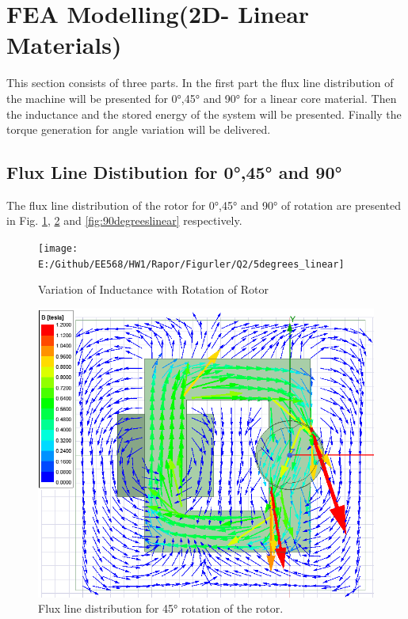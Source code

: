 \documentclass{article}
\begin{document}
\section{FEA Modelling(2D- Linear Materials)}
This section consists of three parts. In the first part the flux line distribution of the machine will be presented for \ang{0},\ang{45} and \ang{90} for a linear core material. Then the inductance and the stored energy of the system will be presented. Finally the torque generation for angle variation will be delivered.

\subsection{Flux Line Distibution for \ang{0},\ang{45} and \ang{90}}
The flux line distribution of the rotor for \ang{0},\ang{45} and \ang{90} of rotation are presented in Fig. \ref{fig:5degreeslinear}, \ref{fig:45degreeslinear} and \ref{fig:90degreeslinear} respectively.
\begin{figure}[H]
	\centering
	\texttt{[image: E:/Github/EE568/HW1/Rapor/Figurler/Q2/5degrees\_linear]}
	\caption{Variation of Inductance with Rotation of Rotor}
	\label{fig:5degreeslinear}
\end{figure}

\begin{figure}[H]
	\centering
	\includegraphics[width=1\linewidth]{Figurler/Q2/45degrees_linear}
	\caption{Flux line distribution for \ang{45} rotation of the rotor.}
	\label{fig:45degreeslinear}
\end{figure}
\end{document}
